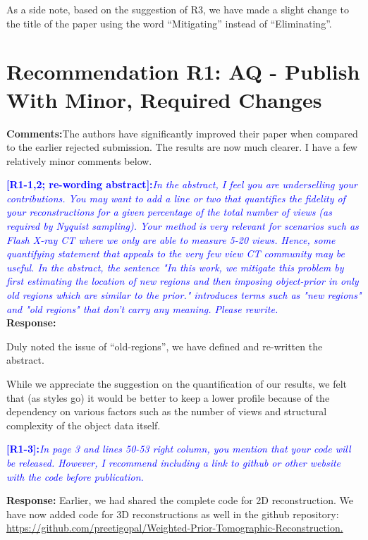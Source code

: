 \documentclass{article}
\begin{document}
As a side note, based on the suggestion of R3, we have made a
slight change to the title of the paper using the word ``Mitigating''
instead of ``Eliminating''.  
  
  \section{Recommendation R1: AQ - Publish With Minor, Required
    Changes} 

  \textbf{Comments:}The authors have significantly improved their
  paper when compared to the earlier rejected submission. The results
  are now much clearer. I have a few relatively minor comments below. 

  \textcolor{blue}{\textbf{[R1-1,2; re-wording abstract]:}\textit{In
      the abstract, I feel you are underselling your
      contributions. You may want to add a line or two that quantifies
      the fidelity of your reconstructions for a given percentage of
      the total number of views (as required by Nyquist
      sampling). Your method is very relevant for scenarios such as
      Flash X-ray CT where we only are able to measure 5-20
      views. Hence, some quantifying statement that appeals to the
      very few view CT community may be useful. In the abstract, the
      sentence "In this work, we mitigate this problem by first
      estimating the location of new regions and then imposing
      object-prior in only old regions which are similar to the
      prior." introduces terms such as "new regions" and "old regions"
      that don't carry any meaning. Please rewrite.}}\\ 

  \textbf{Response:}

  Duly noted the issue of ``old-regions'', we have defined and
  re-written the  abstract. 

  While we appreciate the suggestion on the quantification of our
  results, we felt that (as styles go) it would be better to keep a
  lower profile because of the dependency on various factors such as
  the number of views and structural complexity of the object data
  itself.


  \textcolor{blue}{\textbf{[R1-3]:}\textit{In page 3 and lines 50-53
      right column, you mention that your code will be
      released. However, I recommend including a link to github or
      other website with the code before publication.}} 

  \textbf{Response:} Earlier, we had shared the complete code for 2D
  reconstruction. We have now added code for 3D reconstructions as
  well in the github repository:
  \url{https://github.com/preetigopal/Weighted-Prior-Tomographic-Reconstruction.}
\end{document}
